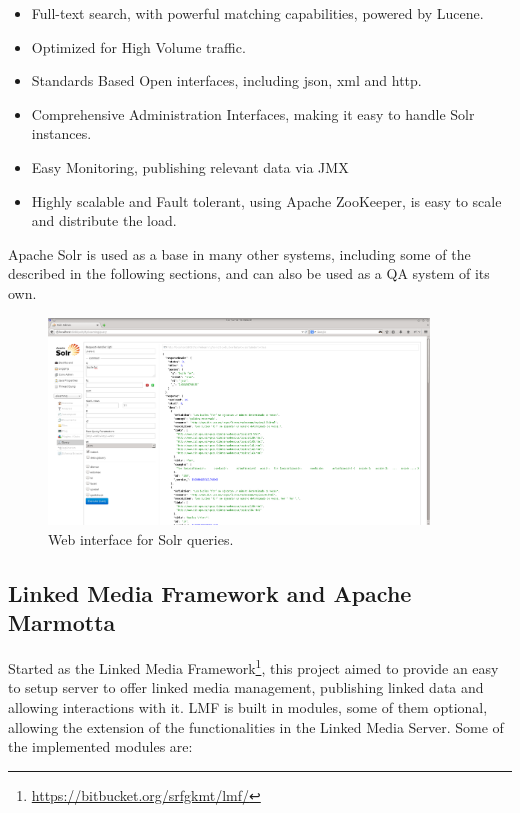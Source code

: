 \begin{itemize}%
  \item Full-text search, with powerful matching capabilities, powered by Lucene.
  \item Optimized for High Volume traffic.
  \item Standards Based Open interfaces, including json, xml and http.
  \item Comprehensive Administration Interfaces, making it easy to handle Solr instances.
  \item Easy Monitoring, publishing relevant data via JMX
  \item Highly scalable and Fault tolerant, using Apache ZooKeeper, is easy to scale and distribute the load.
\end{itemize}

Apache Solr is used as a base in many other systems, including some of the described in the following sections, and can also be used as a \ac{QA} system of its own\cite{ingersoll2013taming}.

\begin{figure}[!htbp]
    \centering
    \includegraphics[width=0.9\textwidth]{img/screens/solr-interface.png}
    \caption{Web interface for Solr queries.}
    \label{fig:solr1}
\end{figure}


\subsection{Linked Media Framework and Apache Marmotta}

Started as the Linked Media Framework\footnote{\url{https://bitbucket.org/srfgkmt/lmf/}}, this project aimed to provide an easy to setup server to offer linked media management, publishing linked data and allowing interactions with it. \ac{LMF} is built in modules, some of them optional, allowing the extension of the functionalities in the Linked Media Server. Some of the implemented modules are:

